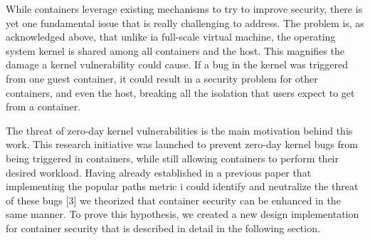 While containers leverage existing mechanisms to try to improve security, there is yet one fundamental issue that is really challenging to address. 
The problem is, as acknowledged above,  that unlike ia full-scale virtual machine, the operating system kernel is shared among all containers and the host. 
This magnifies the damage a kernel vulnerability could cause. If a bug in the kernel was triggered from one guest container, it could result in a security problem for other containers, 
and even the host, breaking all the isolation that users expect to get from a container.

The threat of zero-day kernel vulnerabilities is the main motivation behind this work. 
This research initiative was launched to prevent zero-day kernel bugs from being triggered in containers, while still allowing containers to perform their desired workload. 
Having already established in a previous paper that   implementing the popular paths metric i could identify and neutralize the threat of these bugs [3] 
we theorized that container security can be enhanced in the same manner. 
To prove this hypothesis, we created a new design implementation for container security that is described in detail in the following section.